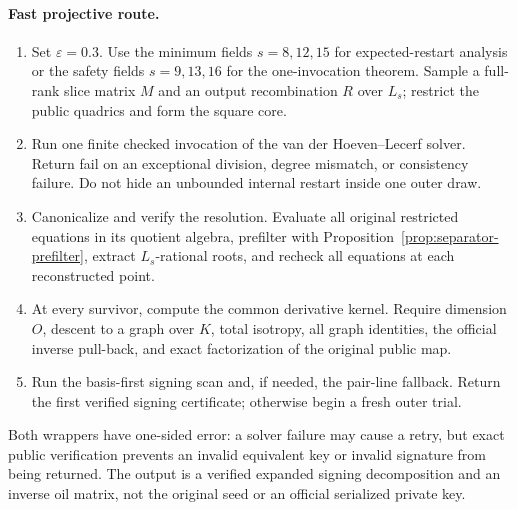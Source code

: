 \documentclass[11pt,a4paper]{article}
\theoremstyle{definition}
\theoremstyle{remark}
\begin{document}
\paragraph{Fast projective route.}
\begin{enumerate}
\item Set $\varepsilon=0.3$.  Use the minimum fields $s=8,12,15$ for expected-restart analysis or the safety fields $s=9,13,16$ for the one-invocation theorem.  Sample a full-rank slice matrix $M$ and an output recombination $R$ over $L_s$; restrict the public quadrics and form the square core.
\item Run one finite checked invocation of the van der Hoeven--Lecerf solver.  Return \textsf{fail} on an exceptional division, degree mismatch, or consistency failure.  Do not hide an unbounded internal restart inside one outer draw.
\item Canonicalize and verify the resolution.  Evaluate all original restricted equations in its quotient algebra, prefilter with Proposition~\ref{prop:separator-prefilter}, extract $L_s$-rational roots, and recheck all equations at each reconstructed point.
\item At every survivor, compute the common derivative kernel.  Require dimension $O$, descent to a graph over $K$, total isotropy, all graph identities, the official inverse pull-back, and exact factorization of the original public map.
\item Run the basis-first signing scan and, if needed, the pair-line fallback.  Return the first verified signing certificate; otherwise begin a fresh outer trial.
\end{enumerate}

Both wrappers have one-sided error: a solver failure may cause a retry, but exact public verification prevents an invalid equivalent key or invalid signature from being returned.  The output is a verified expanded signing decomposition and an inverse oil matrix, not the original seed or an official serialized private key.
\end{document}
